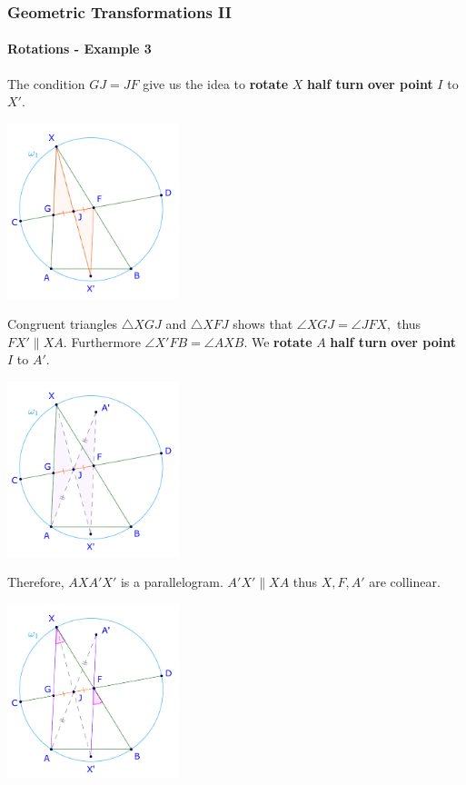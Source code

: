 \documentclass[8pt,xcolor=table,dvipsnames]{beamer}
\begin{document}
\begin{frame}[t]
    \frametitle{Geometric Transformations II}
    \framesubtitle{Rotations - Example 3}
    \begin{overprint}
        The condition $GJ=JF$ give us the idea to \textbf{rotate} $X$ \textbf{half turn} \textbf{over point} $I$ to $X'$.
        \begin{center}
            \includegraphics[width=5cm]{./svg/pdf/rotation-3b.pdf}
        \end{center}
        Congruent triangles $\triangle XGJ$ and $\triangle XFJ$ shows that $\angle XGJ = \angle JFX,$ thus $FX' \parallel XA.$
        Furthermore $\angle X'FB = \angle AXB.$
        We \textbf{rotate} $A$ \textbf{half turn} \textbf{over point} $I$ to $A'$.
        \begin{center}
            \includegraphics[width=5cm]{./svg/pdf/rotation-3c.pdf}
        \end{center}
        Therefore, $AXA'X'$ is a parallelogram.
        $A'X'\parallel XA$ thus $X, F, A'$ are collinear.
        \begin{center}
            \includegraphics[width=5cm]{./svg/pdf/rotation-3d.pdf}

\end{center}
\end{overprint}
\end{frame}
\end{document}

